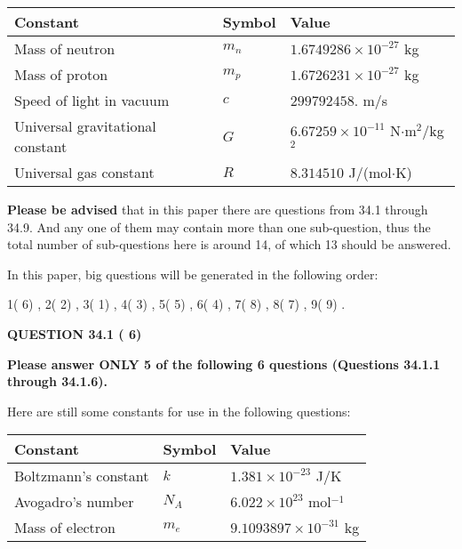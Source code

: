 \documentclass[12pt]{article}
\begin{document}
 
\noindent\begin{tabular}{|l|l|l|}
\hline
Constant & Symbol & Value \\
\hline
Mass of neutron &
$m_n$ &
 $ 1.6749286 \times 10^{-27} $
kg \\
\hline
Mass of proton &
$m_p$ &
 $ 1.6726231 \times 10^{-27} $
kg \\
\hline
Speed of light in vacuum &
$c$ &
 $ 299792458. $
m/s \\
\hline
Universal gravitational constant &
$G$ &
 $ 6.67259 \times 10^{-11} $
N$\cdot $m$^2$/kg$^2$ \\
\hline
Universal gas constant &
$R$ &
 $ 8.314510 $
J/(mol$\cdot $K) \\
\hline
\end{tabular}
 
 
{\textbf{\large{Please be advised}}} that in this paper there are questions from
34.1 through
34.9.
And any one of them may contain more than one sub-question, thus the total number
of sub-questions here is around 14, of which
13 should be answered.
 
\vspace{0.3in}
 
 
   
   
   
\vspace{0.2in}
   
In this paper, big questions will be generated in the following order: 
   
   
            1(          6)
 ,
            2(          2)
 ,
            3(          1)
 ,
            4(          3)
 ,
            5(          5)
 ,
            6(          4)
 ,
            7(          8)
 ,
            8(          7)
 ,
            9(          9)
 .
  
\vspace{0.2in}
  
{\textbf{\Large{QUESTION
34.1 
 (          6)
}}}
  
  
 
{\textbf{\Large{Please answer ONLY
5 of the following
6 questions (Questions
34.1.1 through
34.1.6). }}}
 
Here are still some constants for use in the following questions:
 
 
\noindent\begin{tabular}{|l|l|l|}
\hline
Constant & Symbol & Value \\
\hline
 
Boltzmann's constant &
$k$ &
 $ 1.381 \times 10^{-23} $
J/K \\
\hline
 
Avogadro's number &
$N_A$ &
 $ 6.022 \times 10^{23} $
mol$^{-1}$ \\
\hline
 
Mass of electron &
$m_e$ &
 $ 9.1093897 \times 10^{-31} $
kg \\
\hline
 
\end{tabular}
 
\end{document}
